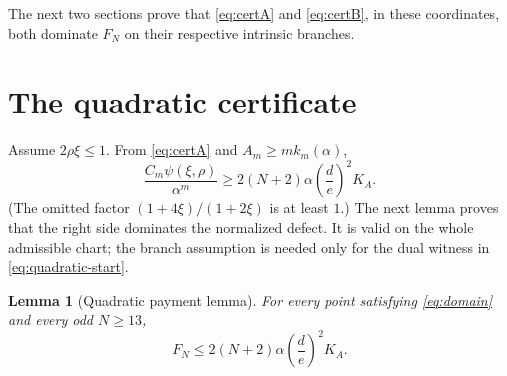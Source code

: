 \documentclass[11pt]{article}
\newtheorem{lemma}[theorem]{Lemma}
\begin{document}
The next two sections prove that \eqref{eq:certA} and \eqref{eq:certB}, in
these coordinates, both dominate $F_N$ on their respective intrinsic
branches.

\section{The quadratic certificate}\label{sec:quadratic}

Assume \(2\rho\xi\le1\).  From \eqref{eq:certA} and
\(A_m\ge m k_m(\alpha)\),
\begin{equation}\label{eq:quadratic-start}
 \frac{C_m\psi(\xi,\rho)}{\alpha^m}
 \ge 2(N+2)\alpha\left(\frac d e\right)^2K_A.
\end{equation}
(The omitted factor \((1+4\xi)/(1+2\xi)\) is at least \(1\).)
The next lemma proves that the right side dominates the normalized defect.
It is valid on the whole admissible chart; the branch assumption is needed
only for the dual witness in \eqref{eq:quadratic-start}.

\begin{lemma}[Quadratic payment lemma]\label{lem:quadratic-payment}
For every point satisfying \eqref{eq:domain} and every odd \(N\ge13\),
\begin{equation}\label{eq:quadratic-lemma}
 F_N\le 2(N+2)\alpha\left(\frac d e\right)^2K_A.
\end{equation}
\end{lemma}
\end{document}
